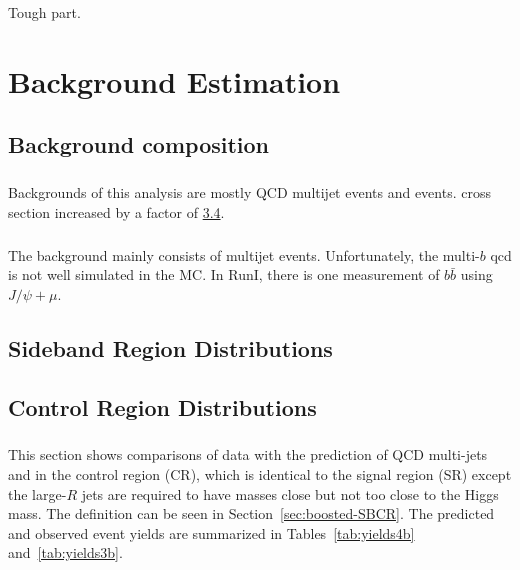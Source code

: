\begin{savequote}[75mm]
Tough part.
\end{savequote}

\chapter{Background Estimation}


\section{Background composition}
\paragraph{}
Backgrounds of this analysis are mostly QCD multijet events and \ttbar events. \ttbar cross section increased by a factor of \href{https://cds.cern.ch/record/2227057/files/STDM-2016-02-02.pdf}{3.4}.

\paragraph{}
The background mainly consists of multijet events. Unfortunately, the multi-$b$ qcd is not well simulated in the MC. In RunI, there is one measurement of \href{https://cds.cern.ch/record/2257262/files/BPHY-2015-04-002.pdf}{$b\bar{b}$} using $J/\psi + \mu$.


\section{Sideband Region Distributions}


\section{Control Region Distributions}

\paragraph{}
This section shows comparisons of data with the prediction of QCD multi-jets and \ttbar in the control region (CR), which is identical to the signal region (SR) except the large-$R$ jets are required to have masses close but not too close to the Higgs mass. The definition can be seen in Section~\ref{sec:boosted-SBCR}. The predicted and observed event yields are summarized in Tables~\ref{tab:yields4b} and~\ref{tab:yields3b}.

